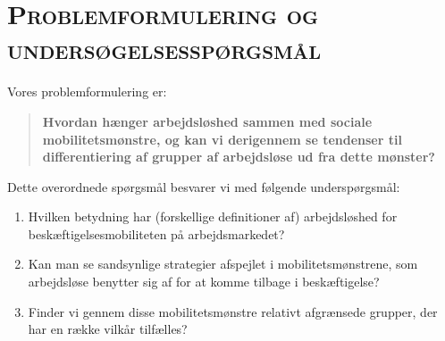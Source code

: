 \section{\textsc{Problemformulering og undersøgelsesspørgsmål}}


Vores problemformulering er:
\begin{quote} %
  \textbf{Hvordan hænger arbejdsløshed sammen med sociale mobilitetsmønstre, og kan vi derigennem se tendenser til differentiering af grupper af arbejdsløse ud fra dette mønster?}%
\end{quote}
%
Dette overordnede spørgsmål besvarer vi med følgende underspørgsmål:
%
 \begin{enumerate} [topsep=6pt,itemsep=-1ex]
   \item Hvilken betydning har (forskellige definitioner af) arbejdsløshed for beskæftigelsesmobiliteten på arbejdsmarkedet?
   \item Kan man se sandsynlige strategier afspejlet i mobilitetsmønstrene, som arbejdsløse benytter sig af for at komme tilbage i beskæftigelse?
    \item Finder vi gennem disse mobilitetsmønstre relativt afgrænsede grupper, der har en række vilkår tilfælles?
 \end{enumerate}
% 


